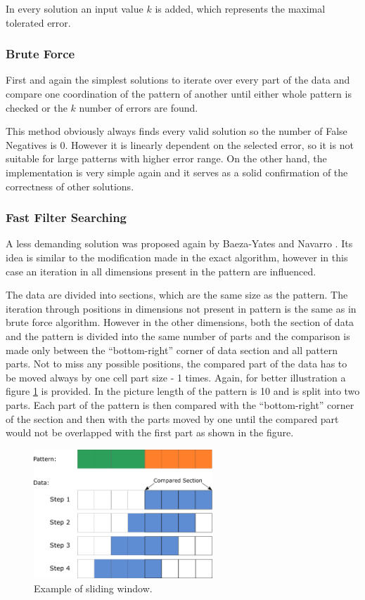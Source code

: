 In every solution an input value $k$ is added, which represents the maximal tolerated error.

\subsubsection{Brute Force}\label{bruteapm}
First and again the simplest solutions to iterate over every part of the data and compare one coordination of the pattern of another until either whole pattern is checked or the $k$ number of errors are found.

This method obviously always finds every valid solution so the number of False Negatives is 0. However it is linearly dependent on the selected error, so it is not suitable for large patterns with higher error range. On the other hand, the implementation is very simple again and it serves as a solid confirmation of the correctness of other solutions.

\subsubsection{Fast Filter Searching}\label{ffsapm}
A less demanding solution was proposed again by Baeza-Yates and Navarro \cite{mdApproxPM}. Its idea is similar to the modification made in the exact algorithm, however in this case an iteration in all dimensions present in the pattern are influenced.

The data are divided into sections, which are the same size as the pattern. The iteration through positions in dimensions not present in pattern is the same as in brute force algorithm. However in the other dimensions, both the section of data and the pattern is divided into the same number of parts and the comparison is made only between the ``bottom-right'' corner of data section and all pattern parts. Not to miss any possible positions, the compared part of the data has to be moved always by one cell part size - 1 times. Again, for better illustration a figure \ref{fig_slide} is provided. In the picture length of the pattern is 10 and is split into two parts. Each part of the pattern is then compared with the ``bottom-right'' corner of the section and then with the parts moved by one until the compared part would not be overlapped with the first part as shown in the figure.

\begin{figure}
\centering
\includegraphics[width=0.6\textwidth]{slide}
\caption{Example of sliding window.}
\label{fig_slide}
\end{figure}

